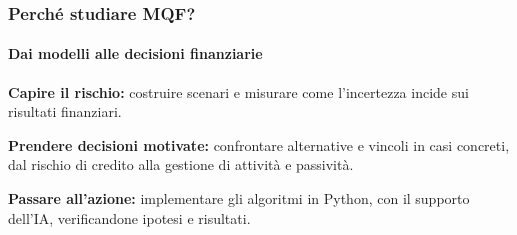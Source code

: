 \begin{frame}%
%

\frametitle{Perch\'{e} studiare MQF?}%
%

\framesubtitle{Dai modelli alle decisioni finanziarie}%
%

%


\begin{stepitemize}
\item \textbf{Capire il rischio:} costruire scenari e misurare come
l'incertezza incide sui risultati finanziari.

\item \textbf{Prendere decisioni motivate:} confrontare alternative e vincoli
in casi concreti, dal rischio di credito alla gestione di attivit\`{a} e passivit\`{a}.

\item \textbf{Passare all'azione:} implementare gli algoritmi in Python, con
il supporto dell'IA, verificandone ipotesi e risultati.
\end{stepitemize}

%

\transboxout
\end{frame}%
%

